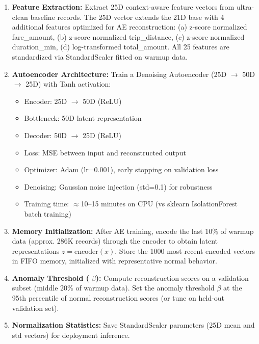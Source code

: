 \begin{enumerate}
    \item \textbf{Feature Extraction:} Extract 25D context-aware feature vectors from ultra-clean baseline records. The 25D vector extends the 21D base with 4 additional features optimized for AE reconstruction: (a) z-score normalized fare\_amount, (b) z-score normalized trip\_distance, (c) z-score normalized duration\_min, (d) log-transformed total\_amount. All 25 features are standardized via StandardScaler fitted on warmup data.

    \item \textbf{Autoencoder Architecture:} Train a Denoising Autoencoder (25D $\rightarrow$ 50D $\rightarrow$ 25D) with Tanh activation:
    \begin{itemize}
        \item Encoder: 25D $\rightarrow$ 50D (ReLU)
        \item Bottleneck: 50D latent representation
        \item Decoder: 50D $\rightarrow$ 25D (ReLU)
        \item Loss: MSE between input and reconstructed output
        \item Optimizer: Adam (lr=0.001), early stopping on validation loss
        \item Denoising: Gaussian noise injection (std=0.1) for robustness
        \item Training time: $\approx$10--15 minutes on CPU (vs sklearn IsolationForest batch training)
    \end{itemize}

    \item \textbf{Memory Initialization:} After AE training, encode the last 10\% of warmup data (approx. 286K records) through the encoder to obtain latent representations $z = \text{encoder}(x)$. Store the 1000 most recent encoded vectors in FIFO memory, initialized with representative normal behavior.

    \item \textbf{Anomaly Threshold (} $\beta$\textbf{):} Compute reconstruction scores on a validation subset (middle 20\% of warmup data). Set the anomaly threshold $\beta$ at the 95th percentile of normal reconstruction scores (or tune on held-out validation set).

    \item \textbf{Normalization Statistics:} Save StandardScaler parameters (25D mean and std vectors) for deployment inference.
\end{enumerate}

